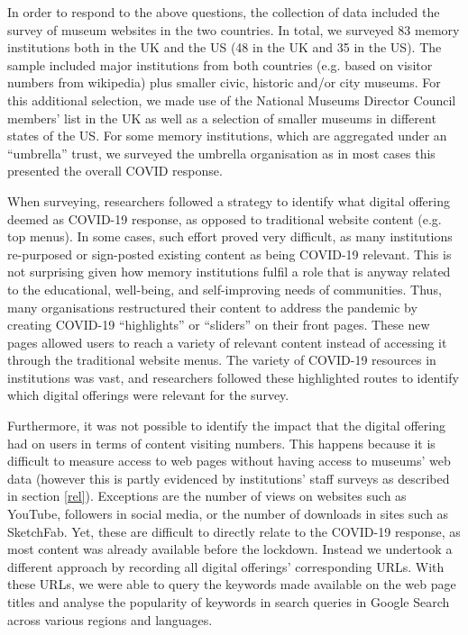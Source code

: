 \documentclass{egpubl}
\begin{document}
In order to respond to the above questions, the collection of data included the survey of museum websites in the two countries. In total, we surveyed 83 memory institutions both in the UK and the US (48 in the  UK and 35 in the US). The sample included major institutions from both countries (e.g. based on visitor numbers from wikipedia) \cite{Wikipedia,Wikipediaa} plus smaller civic, historic and/or city museums. For this additional selection, we made use of the National Museums Director Council members' list in the UK \cite{nationalmuseums:2020} as well as a selection of smaller museums in different states of the US. For some memory institutions, which are aggregated under an ``umbrella'' trust, we surveyed the umbrella organisation as in most cases this presented the overall COVID response.

When surveying, researchers followed a strategy to identify what digital offering deemed as COVID-19 response, as opposed to traditional website content (e.g. top menus). In some cases, such effort proved very difficult, as many institutions re-purposed or sign-posted existing content as being COVID-19 relevant. This is not surprising given how memory institutions fulfil a role that is anyway related to the educational, well-being, and self-improving needs of communities. Thus, many organisations restructured their content to address the pandemic by creating COVID-19 ``highlights'' or ``sliders'' on their front pages. These new pages allowed users to reach a variety of relevant content instead of accessing it through the traditional website menus. The variety of COVID-19 resources in institutions was vast, and researchers followed these highlighted routes to identify which digital offerings were relevant for the survey. 

Furthermore, it was not possible to identify the impact that the digital offering had on users in terms of content visiting numbers. This happens because it is difficult to measure access to web pages without having access to museums’ web data (however this is partly evidenced by institutions' staff surveys as described in section \ref{rel}). Exceptions are the number of views on websites such as YouTube, followers in social media, or the number of downloads in sites such as SketchFab. Yet, these are difficult to directly relate to the COVID-19 response, as most content was already available before the lockdown. Instead we undertook a different approach by recording all digital offerings' corresponding URLs. With these URLs, we were able to query the keywords made available on the web page titles and analyse the popularity of keywords in search queries in Google Search across various regions and languages. 
\end{document}
